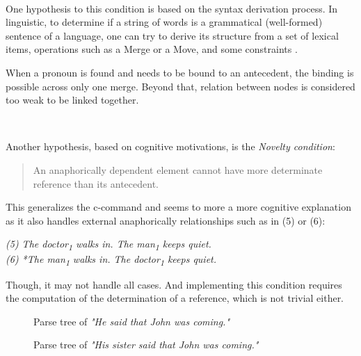 \documentclass[a4paper]{article}
\theoremstyle{definition}
\newcommand{\sub}[1]{\textsubscript{#1}}
\newenvironment{sentence}{\vspace{.1cm}\begin{adjustwidth}{2cm}{}\em}{\end{adjustwidth}\vspace{.1cm}}
\begin{document}
~\par

One hypothesis to this condition is based on the syntax derivation process. In linguistic, to determine if a string of words is a grammatical (well-formed) sentence of a language, one can try to derive its structure from a set of lexical items, operations such as a Merge or a Move, and some constraints \cite{mueller2008derivation}.

When a pronoun is found and needs to be bound to an antecedent, the binding is possible across only one merge. Beyond that, relation between nodes is considered too weak to be linked together.

~\par

Another hypothesis, based on cognitive motivations, is the \emph{Novelty condition}: 
\begin{quote}
An anaphorically dependent element cannot have more determinate reference than its antecedent. \cite{wasow1979anaphora}
\end{quote}
This generalizes the c-command and seems to more a more cognitive explanation as it also handles external anaphorically relationships such as in (5) or (6):
\begin{sentence}
(5) The doctor\sub{1} walks in. The man\sub{1} keeps quiet. \\
(6) *The man\sub{1} walks in. The doctor\sub{1} keeps quiet.
\end{sentence}
Though, it may not handle all cases. And implementing this condition requires the computation of the determination of a reference, which is not trivial either.

\begin{figure}
\centering
{}
\caption{Parse tree of \emph{"He said that John was coming."}\label{fig:parse_tree_he_said}}
\end{figure}

\begin{figure}
\centering
{}
\caption{Parse tree of \emph{"His sister said that John was coming."}\label{fig:parse_tree_his_sister}}
\end{figure}
\end{document}
